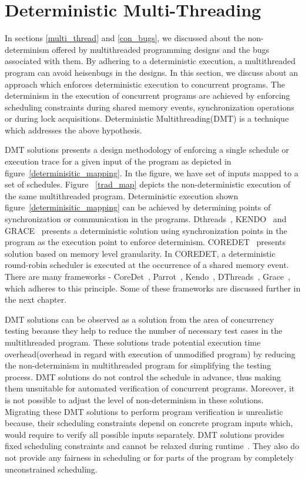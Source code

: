 \section{Deterministic Multi-Threading \label{sec_dmt}}

In sections \ref{multi_thread} and \ref{con_bugs}, we discussed about the non-determinism offered by multithreaded programming designs and the bugs associated with them. 
By adhering to a deterministic execution, a multithreaded program can avoid heisenbugs in the designs. 
In this section, we discuss about an approach which enforces deterministic execution to concurrent programs. 
The determinism in the execution of concurrent programs are achieved by enforcing scheduling constraints during shared memory events, synchronization operations or during lock acquisitions. 
Deterministic Multithreading(DMT) is a technique which addresses the above hypothesis. 

DMT solutions presents a design methodology of enforcing a single schedule or execution trace for a given input of the program as depicted in figure~\ref{determinisitic_mapping}. 
In the figure, we have set of inputs mapped to a set of schedules. 
Figure~ \ref{trad_map} depicts the non-deterministic execution of the same multithreaded program. 
Deterministic execution shown figure~\ref{determinisitic_mapping} can be achieved by determining points of synchronization or communication in the programs. 
Dthreads~\citep{dthreads}, KENDO~\citep{kendo} and GRACE~\citep{grace} presents a deterministic solution using synchronization points in the program as the execution point to enforce determinism. 
COREDET~\citep{coredet} presents solution based on memory level granularity. 
In COREDET, a deterministic round-robin scheduler is executed at the occurrence of a shared memory event. 
There are many frameworks - CoreDet~\citep{coredet}, Parrot~\citep{parrot}, Kendo~\citep{kendo}, DThreads~\citep{dthreads}, Grace~\citep{grace}, which adheres to this principle. 
Some of these frameworks are discussed further in the next chapter. 

DMT solutions can be observed as a solution from the area of concurrency testing because they help to reduce the number of necessary test cases in the multithreaded program. 
These solutions trade potential execution time overhead(overhead in regard with execution of unmodified program) by reducing the non-determinism in multithreaded program for simplifying the testing process. 
DMT solutions do not control the schedule in advance, thus making them unsuitable for automated verification of concurrent programs. 
Moreover, it is not possible to adjust the level of non-determinism in these solutions. 
Migrating these DMT solutions to perform program verification is unrealistic because, their scheduling constraints depend on concrete program inputs which, would require to verify all possible inputs separately. 
DMT solutions provides fixed scheduling constraints and cannot be relaxed during runtime~\citep{metzler2017quick}. 
They also do not provide any fairness in scheduling or for parts of the program by completely unconstrained scheduling. 



